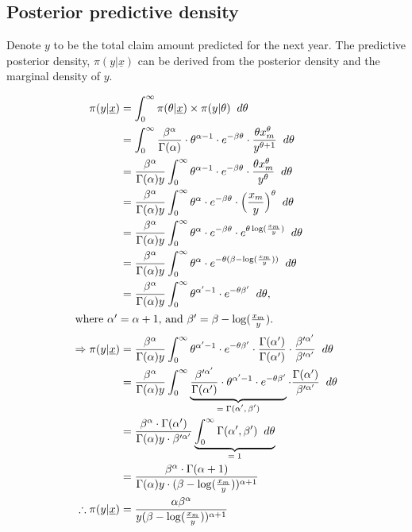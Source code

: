 \documentclass[11pt,a4paper]{article}
\renewcommand{\a}{\alpha}
\renewcommand{\b}{\beta}
\renewcommand{\th}{\theta}
\begin{document}
\subsection{Posterior predictive density}

Denote $y$ to be the total claim amount predicted for the next year. The predictive posterior density, $\pi(y|\underline x)$ can be derived from the posterior density and the marginal density of $y$. 

\begin{align*}
    \pi(y | \underline x) &= \int_0^\infty \pi(\th| \underline x) \times \pi(y|\th) \;\; d\th  \\
                          &= \int_0^\infty \frac{\b^\a}{\Gamma(\a)} \cdot \th^{\a-1} \cdot e^{-\b\th} \cdot \frac{\theta x_m^\theta}{y^{\theta+1}}  \;\;d\th\\
                          &= \frac{\b^\a}{\Gamma(\a)y} \int_0^\infty \th^{\a-1} \cdot e^{-\b\th} \cdot \frac{\theta x_m^\theta}{y^{\theta}} \;\;d\th \\ 
                          &= \frac{\b^\a}{\Gamma(\a)y} \int_0^\infty \th^{\a} \cdot e^{-\b\th} \cdot \Big( \frac{x_m}{y} \Big)^\th   \;\;d\th \\
                          &= \frac{\b^\a}{\Gamma(\a)y} \int_0^\infty \th^{\a} \cdot e^{-\b\th} \cdot e^{\th\log(\frac{x_m}{y})}  \;\; d\th  \\
                          &= \frac{\b^\a}{\Gamma(\a)y} \int_0^\infty \th^{\a} \cdot e^{ -\th(\b - \log(\frac{x_m}{y})) }   \;\;d\th \\
                          &= \frac{\b^\a}{\Gamma(\a)y} \int_0^\infty \th^{\a'-1} \cdot e^{-\th\b'} \;\;d\th, \\
                            \shortintertext{where $\a'=\a+1$, and $\b' = \b -\log(\frac{x_m}{y})$.}
            \Rightarrow \pi(y|\underline x) &= \frac{\b^\a}{\Gamma(\a)y} \int_0^\infty \th^{\a'-1} \cdot e^{-\th\b'} \cdot \frac{\Gamma(\a')}{\Gamma(\a')} \cdot \frac{\b'^{\a'}}{\b'^{\a'}} \;\;d\th \\ 
                          &= \frac{\b^\a}{\Gamma(\a)y} \int_0^\infty \underbrace{\frac{\b'^{\a'}}{\Gamma(\a')} \cdot \th^{\a'-1} \cdot e^{-\th\b'}}_\text{$=\Gamma(\a',\b')$} \cdot \frac{\Gamma(\a')}{\b'^{\a'}}\;\;d\th  \\
                          &= \frac{\b^\a \cdot \Gamma(\a')}{\Gamma(\a)y \cdot \b'^{\a'}} \underbrace{\int_0^\infty \Gamma(\a',\b')  \;\;d\th}_\text{$=1$} \\
                          &= \frac{\b^\a \cdot \Gamma(\a + 1)}{\Gamma(\a)y \cdot (\b-\log(\frac{x_m}{y}))^{\a+1}} \\
    \therefore \pi(y|\underline x) &= \frac{\a\b^\a}{y(\b-\log(\frac{x_m}{y}))^{\a+1}}
\end{align*}
\end{document}
